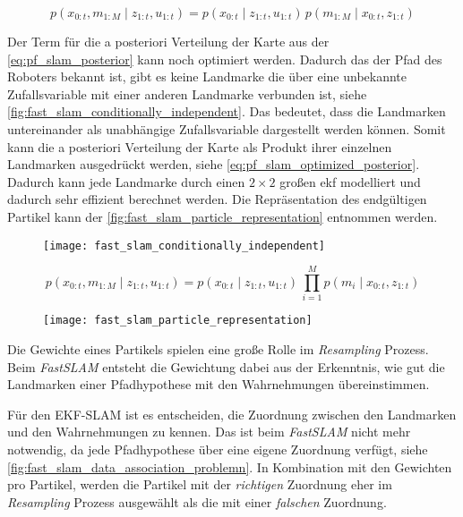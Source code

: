 \begin{equation}
p(x_{0:t}, m_{1:M} \mid z_{1:t}, u_{1:t}) = p(x_{0:t} \mid z_{1:t}, u_{1:t}) \, p(m_{1:M} \mid x_{0:t}, z_{1:t}) \label{eq:pf_slam_posterior}
\end{equation}

Der Term für die a posteriori Verteilung der Karte aus der \autoref{eq:pf_slam_posterior} kann noch optimiert werden. Dadurch das der Pfad des Roboters bekannt ist, gibt es keine Landmarke die über eine unbekannte Zufallsvariable mit einer anderen Landmarke verbunden ist, siehe \autoref{fig:fast_slam_conditionally_independent}. Das bedeutet, dass die Landmarken untereinander als unabhängige Zufallsvariable dargestellt werden können. Somit kann die a posteriori Verteilung der Karte als Produkt ihrer einzelnen Landmarken ausgedrückt werden, siehe \autoref{eq:pf_slam_optimized_posterior}. Dadurch kann jede Landmarke durch einen $2 \times 2$ großen \gls{ekf} modelliert und dadurch sehr effizient berechnet werden. Die Repräsentation des endgültigen Partikel kann der \autoref{fig:fast_slam_particle_representation} entnommen werden.

\begin{figure}
	\centering
	\texttt{[image: fast\_slam\_conditionally\_independent]}
	\label{fig:fast_slam_conditionally_independent}
\end{figure}

\begin{equation}
p(x_{0:t}, m_{1:M} \mid z_{1:t}, u_{1:t}) = p(x_{0:t} \mid z_{1:t}, u_{1:t}) \, \prod_{i=1}^{M} p(m_i \mid x_{0:t}, z_{1:t}) \label{eq:pf_slam_optimized_posterior}
\end{equation}

\begin{figure}
	\centering
	\texttt{[image: fast\_slam\_particle\_representation]}
	\label{fig:fast_slam_particle_representation}
\end{figure}

Die Gewichte eines Partikels spielen eine große Rolle im \textit{Resampling} Prozess. Beim \textit{FastSLAM} entsteht die Gewichtung dabei aus der Erkenntnis, wie gut die Landmarken einer Pfadhypothese mit den Wahrnehmungen übereinstimmen.

Für den EKF-SLAM ist es entscheiden, die Zuordnung zwischen den Landmarken und den Wahrnehmungen zu kennen. Das ist beim \textit{FastSLAM} nicht mehr notwendig, da jede Pfadhypothese über eine eigene Zuordnung verfügt, siehe \autoref{fig:fast_slam_data_association_problemn}. In Kombination mit den Gewichten pro Partikel, werden die Partikel mit der \textit{richtigen} Zuordnung eher im \textit{Resampling} Prozess ausgewählt als die mit einer \textit{falschen} Zuordnung.

